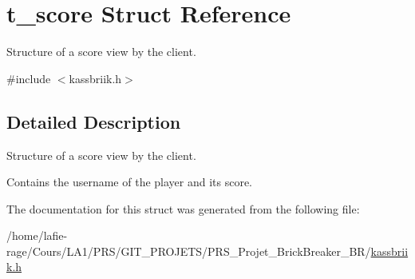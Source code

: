 \hypertarget{structt__score}{}\section{t\+\_\+score Struct Reference}
\label{structt__score}


Structure of a score view by the client.  




{\ttfamily \#include $<$kassbriik.\+h$>$}



\subsection{Detailed Description}
Structure of a score view by the client. 

Contains the username of the player and its score. 

The documentation for this struct was generated from the following file\+:\begin{DoxyCompactItemize}
\item 
/home/lafie-\/rage/\+Cours/\+L\+A1/\+P\+R\+S/\+G\+I\+T\+\_\+\+P\+R\+O\+J\+E\+T\+S/\+P\+R\+S\+\_\+\+Projet\+\_\+\+Brick\+Breaker\+\_\+\+B\+R/\hyperlink{kassbriik_8h}{kassbriik.\+h}\end{DoxyCompactItemize}
